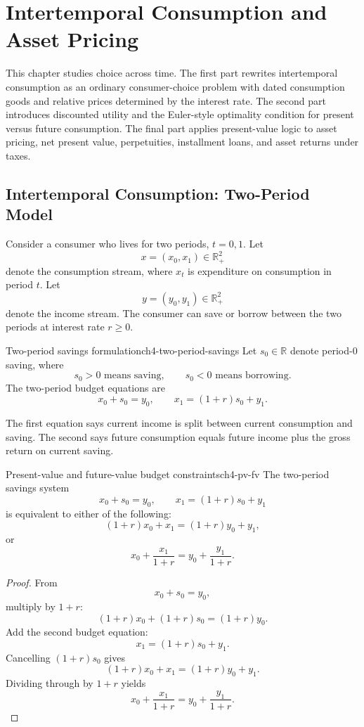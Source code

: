 
\section{Intertemporal Consumption and Asset Pricing}

This chapter studies choice across time. The first part rewrites intertemporal consumption as an ordinary consumer-choice problem with dated consumption goods and relative prices determined by the interest rate. The second part introduces discounted utility and the Euler-style optimality condition for present versus future consumption. The final part applies present-value logic to asset pricing, net present value, perpetuities, installment loans, and asset returns under taxes.

\subsection{Intertemporal Consumption: Two-Period Model}

Consider a consumer who lives for two periods, $t=0,1$. Let
\[
x=(x_0,x_1)\in \mathbb{R}_+^2
\]
denote the consumption stream, where $x_t$ is expenditure on consumption in period $t$. Let
\[
y=(y_0,y_1)\in \mathbb{R}_+^2
\]
denote the income stream. The consumer can save or borrow between the two periods at interest rate $r\ge 0$.

\begin{definition}{Two-period savings formulation}{ch4-two-period-savings}
Let $s_0 \in \mathbb{R}$ denote period-0 saving, where
\[
s_0>0 \text{ means saving}, \qquad s_0<0 \text{ means borrowing}.
\]
The two-period budget equations are
\[
x_0+s_0=y_0,
\qquad
x_1=(1+r)s_0+y_1.
\]
\end{definition}

The first equation says current income is split between current consumption and saving. The second says future consumption equals future income plus the gross return on current saving.

\begin{theorem}{Present-value and future-value budget constraints}{ch4-pv-fv}
The two-period savings system
\[
x_0+s_0=y_0,
\qquad
x_1=(1+r)s_0+y_1
\]
is equivalent to either of the following:
\[
(1+r)x_0+x_1=(1+r)y_0+y_1,
\]
or
\[
x_0+\frac{x_1}{1+r}=y_0+\frac{y_1}{1+r}.
\]
\end{theorem}

\begin{proof}
From
\[
x_0+s_0=y_0,
\]
multiply by $1+r$:
\[
(1+r)x_0+(1+r)s_0=(1+r)y_0.
\]
Add the second budget equation:
\[
x_1=(1+r)s_0+y_1.
\]
Cancelling $(1+r)s_0$ gives
\[
(1+r)x_0+x_1=(1+r)y_0+y_1.
\]
Dividing through by $1+r$ yields
\[
x_0+\frac{x_1}{1+r}=y_0+\frac{y_1}{1+r}.
\]
\end{proof}

